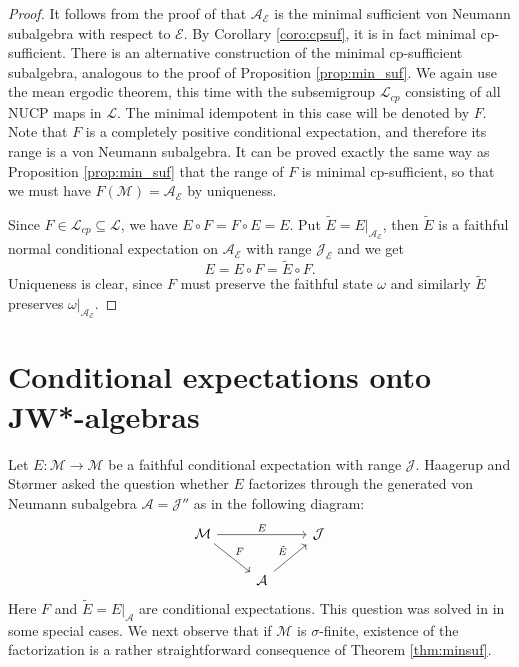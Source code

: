 \documentclass[12pt]{article}
\def\Me{\mathcal M}
\def\Ee{\mathcal E}
\def\Le{\mathcal L}
\def\Je{\mathcal J}
\def\Ae{\mathcal A}
\theoremstyle{definition}
\theoremstyle{remark}
\begin{document}
\begin{proof} It follows from the proof of \cite[Thm.~1]{luczak2014quantum} that $\Ae_\Ee$
is the minimal sufficient von Neumann subalgebra with respect to $\Ee$. By Corollary
\ref{coro:cpsuf}, it is in fact minimal cp-sufficient.
There is  an alternative construction of the minimal cp-sufficient subalgebra,
analogous to the proof of Proposition \ref{prop:min_suf}.  
We again use the mean ergodic theorem, this time with the subsemigroup  $\Le_{cp}$ consisting of all NUCP maps in $\Le$.  
The minimal idempotent in this case will be
denoted by $F$. Note that $F$ is a completely positive conditional expectation, and therefore its range is
a von Neumann subalgebra.  It can be  proved exactly the same  way as Proposition \ref{prop:min_suf} that
the range of $F$ is minimal cp-sufficient, so that we must have $F(\Me)=\Ae_\Ee$ by
uniqueness.

Since  $F\in \Le_{cp}\subseteq \Le$, we have $E\circ F=F\circ E=E$.  Put $\tilde
E=E|_{\Ae_{\Ee}}$, then $\tilde E$ is a faithful normal conditional expectation on $\Ae_\Ee$ with
range $\Je_\Ee$ and we get
\[
E=E\circ F=\tilde E\circ F.
\]
Uniqueness is clear, since $F$ must preserve the faithful state $\omega$ and similarly $\tilde E$ preserves $\omega|_{\Ae_\Ee}$. 



\end{proof}


\section{Conditional expectations onto JW*-algebras} 


Let  $E:\Me\to \Me$ be a faithful conditional expectation with range $\Je$. 
Haagerup and  Størmer \cite{haagerup1995positive} asked the question whether $E$
factorizes through the generated von Neumann subalgebra $\Ae=\Je''$ as in the following diagram:
\begin{equation}
    \begin{tikzcd}
    \Me \arrow{rr}{E} \arrow{dr}{F} & & \Je \\
    &\Ae \arrow{ur}{\tilde E}
\end{tikzcd}
\end{equation}
Here $F$ and $\tilde E =E|_\Ae$ are conditional expectations. This question was solved in
\cite{haagerup1995positive} in some special cases. We next observe that if $\Me$ is
$\sigma$-finite,  existence of the factorization is a rather straightforward consequence
of Theorem \ref{thm:minsuf}.
 
\end{document}
